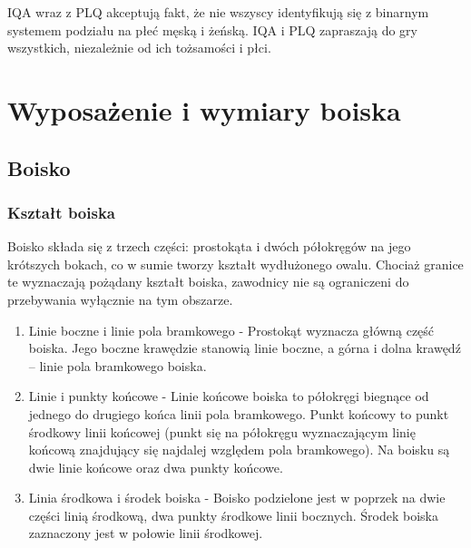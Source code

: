 \documentclass[12pt]{article}
\begin{document}
IQA wraz z PLQ akceptują fakt, że nie wszyscy identyfikują się z
binarnym systemem podziału na płeć męską i żeńską. IQA i PLQ zapraszają
do gry wszystkich, niezależnie od ich tożsamości i płci.

\pagebreak
\section{Wyposażenie i wymiary boiska}

\subsection{Boisko}

\subsubsection{Kształt boiska}
Boisko składa się z trzech części: prostokąta i dwóch półokręgów na jego
krótszych bokach, co w sumie tworzy kształt wydłużonego owalu. Chociaż
granice te wyznaczają pożądany kształt boiska, zawodnicy nie są
ograniczeni do przebywania wyłącznie na tym obszarze.
\begin{enumerate}
	\item{Linie boczne i linie pola bramkowego} - Prostokąt wyznacza
	      główną część boiska. Jego boczne krawędzie stanowią linie boczne, a
	      górna i dolna krawędź -- linie pola bramkowego boiska.

	\item{Linie i punkty końcowe} - Linie końcowe boiska to
	      półokręgi biegnące od jednego do drugiego końca linii pola bramkowego.
	      Punkt końcowy to punkt środkowy linii końcowej (punkt się na półokręgu
	      wyznaczającym linię końcową znajdujący się najdalej względem pola
	      bramkowego). Na boisku są dwie linie końcowe oraz dwa punkty końcowe.

	\item{Linia środkowa i środek boiska} - Boisko podzielone
	      jest w poprzek na dwie części linią środkową, dwa punkty środkowe linii
	      bocznych. Środek boiska zaznaczony jest w połowie linii środkowej.
\end{enumerate}
\end{document}
